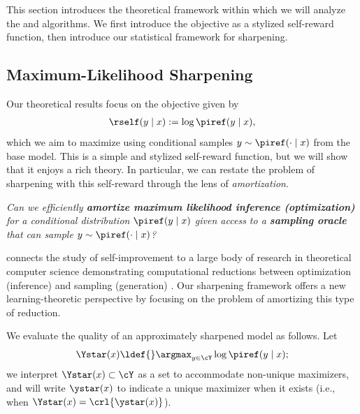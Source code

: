 
This section introduces the theoretical framework within which we will
analyze the \bestofnalg and \rlhfalg algorithms. We first introduce
the \mlsharp objective as a stylized self-reward function, then
introduce our statistical framework for sharpening.
\subsection{Maximum-Likelihood Sharpening}\label{sec:autoreg_sharpening}

Our theoretical results focus on the \mlsharp objective given
by
\begin{align}
  \label{eq:ml_sharpening2}
    \rself(y \mid x) := \log \piref(y \mid x),
\end{align}
which we aim to maximize using conditional samples
$y\sim\piref(\cdot\mid{}x)$ from the base model. This is a simple and stylized self-reward function, but we will show
that it enjoys a rich theory. In
particular, we can restate the problem of sharpening with this self-reward through the lens of \emph{amortization}.
\loose
\begin{mainbox}
  \emph{Can we efficiently \textbf{amortize maximum likelihood
      inference (optimization)}
  for a conditional distribution $\piref(y\mid{}x)$ given access to a
  \textbf{sampling oracle} that can sample $y\sim\piref(\cdot \mid{}x)$?\loose}
\end{mainbox}
 \Mlsharp connects
the study of self-improvement to a large body of research in
theoretical computer science demonstrating computational reductions between
optimization (inference) and sampling (generation)
\citep{kirkpatrick1983optimization,lovasz2006fast,singh2014entropy,ma2019sampling,talwar2019computational}. %
Our sharpening framework offers a new learning-theoretic perspective by focusing on the problem of amortizing this
type of reduction. \msdelete{}

We evaluate the quality of an
approximately sharpened model as follows. Let
\[\Ystar(x)\ldef{}\argmax_{y\in\cY}\log \piref(y\mid{}x);\] we interpret
$\Ystar(x)\subset\cY$ as a set  to accommodate non-unique
maximizers, and will write $\ystar(x)$ to indicate a
unique maximizer when it exists (i.e., when
$\Ystar(x)=\crl{\ystar(x)}$). 


